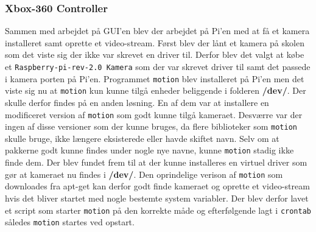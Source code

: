 \subsubsection{Xbox-360 Controller} \label{sec:controller}

Sammen med arbejdet på GUI’en blev der arbejdet på Pi’en med at få et kamera installeret samt oprette et video-stream. Først blev der lånt et kamera på skolen som det viste sig der ikke var skrevet en driver til. Derfor blev det valgt at købe et \texttt{Raspberry-pi-rev-2.0 Kamera} som der var skrevet driver til samt det passede i kamera porten på Pi’en. Programmet \texttt{motion} blev installeret på Pi’en men det viste sig nu at \texttt{motion} kun kunne tilgå enheder beliggende i folderen \textbf{\//dev/}. Der skulle derfor findes på en anden løsning. En af dem var at installere en modificeret version af \texttt{motion} \cite{lib:motion-on-raspberry} som godt kunne tilgå kameraet. Desværre var der ingen af disse versioner som der kunne bruges, da flere biblioteker som \texttt{motion} skulle bruge, ikke længere eksisterede eller havde skiftet navn. Selv om at pakkerne godt kunne findes under nogle nye navne, kunne \texttt{motion} stadig ikke finde dem. Der blev fundet frem til at der kunne installeres en virtuel driver \cite{lib:camera-driver} som gør at kameraet nu findes i \textbf{\//dev/}. Den oprindelige verison af \texttt{motion} som downloades fra apt-get kan derfor godt finde kameraet og oprette et video-stream hvis det bliver startet med nogle bestemte system variabler. Der blev derfor lavet et script som starter \texttt{motion} på den korrekte måde og efterfølgende lagt i \texttt{crontab} således \texttt{motion} startes ved opstart. 